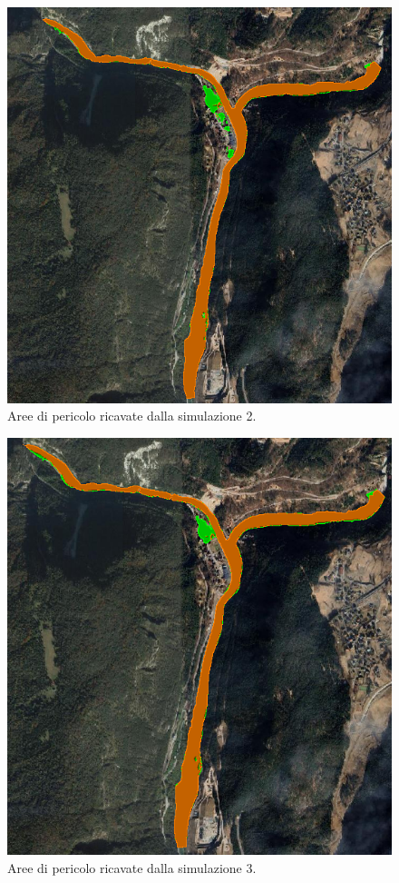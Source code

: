 \begin{figure}[htb] \centering
    \includegraphics[scale=0.5]{immagini/aree_pericolo_2.png}
    \caption{Aree di pericolo ricavate dalla simulazione 2.}
    \label{figure:aree_pericolo_2}
\end{figure}

\begin{figure}[htb] \centering
    \includegraphics[scale=0.5]{immagini/aree_pericolo_3.png}
    \caption{Aree di pericolo ricavate dalla simulazione 3.}
    \label{figure:aree_pericolo_3}
\end{figure}


